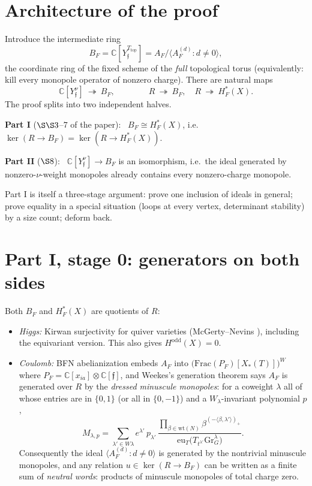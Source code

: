 \documentclass[11pt]{amsart}
\theoremstyle{remark}
\newcommand{\C}{\mathbb{C}}
\newcommand{\Gr}{\mathrm{Gr}}
\newcommand{\eu}{\mathrm{eu}}
\newcommand{\Ttop}{T_{\mathrm{top}}}
\newcommand{\Hc}{H^*_F(X)}
\begin{document}
\section{Architecture of the proof}

Introduce the intermediate ring
\[
 B_F=\C[Y_{\mathfrak f}^{\Ttop}]=A_F\big/\big\langle A_F^{(d)} : d\neq 0\big\rangle,
\]
the coordinate ring of the fixed scheme of the \emph{full} topological
torus (equivalently: kill every monopole operator of nonzero charge).
There are natural maps
\[
 \C[Y_{\mathfrak f}^\nu]\ \twoheadrightarrow\ B_F,
 \qquad\qquad
 R\ \twoheadrightarrow\ B_F,\quad R\ \twoheadrightarrow\ \Hc .
\]
The proof splits into two independent halves.

\medskip
\noindent\textbf{Part I} ($\S\S3$--$7$ of the paper): \ $B_F\cong\Hc$, i.e.\
$\ker(R\to B_F)=\ker(R\to\Hc)$.

\noindent\textbf{Part II} ($\S8$): \ $\C[Y_{\mathfrak f}^\nu]\to B_F$ is an
isomorphism, i.e.\ the ideal generated by nonzero-$\nu$-weight monopoles
already contains every nonzero-charge monopole.

\medskip
Part I is itself a three-stage argument: prove one inclusion of ideals in
general; prove equality in a special situation (loops at every vertex,
determinant stability) by a size count; deform back.

\section{Part I, stage 0: generators on both sides}

Both $B_F$ and $\Hc$ are quotients of $R$:
\begin{itemize}[leftmargin=2em]
\item \emph{Higgs:} Kirwan surjectivity for quiver varieties
(McGerty--Nevins \cite{MN18}), including the equivariant version.  This also
gives $H^{\mathrm{odd}}(X)=0$.
\item \emph{Coulomb:} BFN abelianization embeds $A_F$ into
$\big(\mathrm{Frac}(P_F)[X_*(T)]\big)^W$ where $P_F=\C[x_{ia}]\otimes\C[\mathfrak f]$,
and Weekes's generation theorem \cite{Weekes19} says $A_F$ is generated over $R$ by
the \emph{dressed minuscule monopoles}: for a coweight $\lambda$ all of whose
entries are in $\{0,1\}$ (or all in $\{0,-1\}$) and a $W_\lambda$-invariant
polynomial $p$,
\begin{equation}\label{eq:minuscule}
 M_{\lambda,p}=\sum_{\lambda'\in W\lambda}
 e^{\lambda'}\,p_{\lambda'}\,
 \frac{\prod_{\beta\in\mathrm{wt}(N)}\beta^{(-\langle\beta,\lambda'\rangle)_+}}
      {\eu_T\big(T_{t^{\lambda'}}\Gr_G^{\lambda}\big)} .
\end{equation}
Consequently the ideal $\langle A_F^{(d)}:d\neq0\rangle$ is generated by the
nontrivial minuscule monopoles, and any relation $u\in\ker(R\to B_F)$ can be
written as a finite sum of \emph{neutral words}: products of minuscule
monopoles of total charge zero.
\end{itemize}
\end{document}
